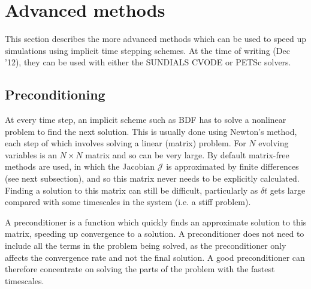 \documentclass[12pt]{article}
\begin{document}
\section{Advanced methods}
\label{sec:precon}

This section describes the more advanced methods which can be used to speed up simulations using
implicit time stepping schemes. At the time of writing (Dec '12), they can be used with either the SUNDIALS CVODE
or PETSc solvers. 

\subsection{Preconditioning}

At every time step, an implicit scheme such as BDF has to solve a nonlinear problem to find the next
solution. This is usually done using Newton's method, each step of which involves solving a linear (matrix)
problem. For $N$ evolving variables is an $N\times N$ matrix and so can be very large. 
By default matrix-free methods are used, in which the 
Jacobian $\mathcal{J}$ is approximated by finite differences (see next subsection), and so this matrix
never needs to be explicitly calculated. Finding a solution to this matrix can still be difficult, particularly
as $\delta t$ gets large compared with some timescales in the system (i.e. a stiff problem).

A preconditioner is a function which quickly finds an approximate solution to this matrix, speeding up
convergence to a solution. A preconditioner does not need to include all the terms in the problem being
solved, as the preconditioner only affects the convergence rate and not the final solution. A good preconditioner
can therefore concentrate on solving the parts of the problem with the fastest timescales.
\end{document}
